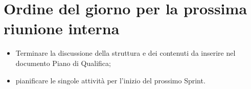 \documentclass[12pt]{article}
\begin{document}
    \section{Ordine del giorno per la prossima riunione interna}
        \begin{itemize}
        		\item Terminare la discussione della struttura e dei contenuti da inserire nel documento Piano di Qualifica;
        		\item pianificare le singole attività per l'inizio del prossimo Sprint.
    	\end{itemize}
\end{document}
